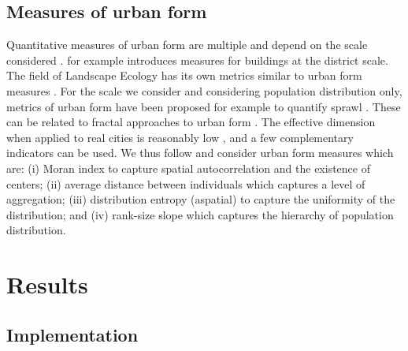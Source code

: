 \documentclass[10pt,letterpaper]{article}
\begin{document}



\subsection*{Measures of urban form}


Quantitative measures of urban form are multiple and depend on the scale considered \cite{zhang2005metrics}. \cite{raimbault2019generating} for example introduces measures for buildings at the district scale. The field of Landscape Ecology has its own metrics similar to urban form measures \cite{10.1371/journal.pone.0225734}. For the scale we consider and considering population distribution only, metrics of urban form have been proposed for example to quantify sprawl \cite{tsai2005quantifying}. These can be related to fractal approaches to urban form \cite{chen2011derivation}. The effective dimension when applied to real cities is reasonably low \cite{schwarz2010urban}, and a few complementary indicators can be used. We thus follow \cite{10.1371/journal.pone.0203516} and consider urban form measures which are: (i) Moran index to capture spatial autocorrelation and the existence of centers; (ii) average distance between individuals which captures a level of aggregation; (iii) distribution entropy (aspatial) to capture the uniformity of the distribution; and (iv) rank-size slope which captures the hierarchy of population distribution.






\section*{Results}


\subsection*{Implementation}
\end{document}
